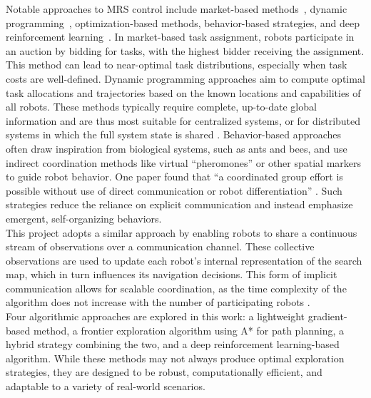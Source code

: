 Notable approaches to MRS control include market-based methods~\cite{trigui2014market}, dynamic programming~\cite{kato2011dp}, optimization-based methods, behavior-based strategies, and deep reinforcement learning~\cite{huttenrauch2019deep-swarm}. In market-based task assignment, robots participate in an auction by bidding for tasks, with the highest bidder receiving the assignment. This method can lead to near-optimal task distributions, especially when task costs are well-defined. Dynamic programming approaches aim to compute optimal task allocations and trajectories based on the known locations and capabilities of all robots. These methods typically require complete, up-to-date global information and are thus most suitable for centralized systems, or for distributed systems in which the full system state is shared \cite{multi-robot-search-moving-target}.
Behavior-based approaches often draw inspiration from biological systems, such as ants and bees, and use indirect coordination methods like virtual “pheromones” or other spatial markers to guide robot behavior. One paper found that “a coordinated group effort is possible without use of direct communication or robot differentiation” \cite{kube2000cooperative-ants}. Such strategies reduce the reliance on explicit communication and instead emphasize emergent, self-organizing behaviors. \\

This project adopts a similar approach by enabling robots to share a continuous stream of observations over a communication channel. These collective observations are used to update each robot’s internal representation of the search map, which in turn influences its navigation decisions. This form of implicit communication allows for scalable coordination, as the time complexity of the algorithm does not increase with the number of participating robots \cite{multi-robot-search-moving-target}.\\

Four algorithmic approaches are explored in this work: a lightweight gradient-based method, a frontier exploration algorithm using A* for path planning, a hybrid strategy combining the two, and a deep reinforcement learning-based algorithm. 
While these methods may not always produce optimal exploration strategies, they are designed to be robust, computationally efficient, and adaptable to a variety of real-world scenarios.
